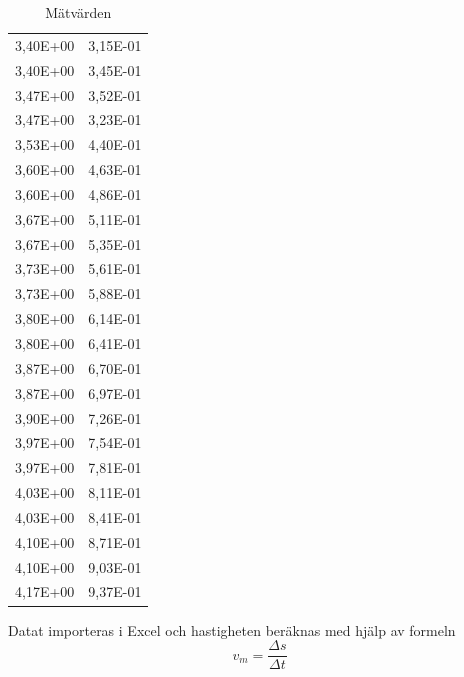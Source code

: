 \documentclass[11p, titlepage, oneside, a4paper]{article}
\begin{document}
\begin{table}
\begin{center}
\begin{tabular}{ |c|c| }
                3,40E+00 & 3,15E-01 \\
                3,40E+00 & 3,45E-01 \\
                3,47E+00 & 3,52E-01 \\
                3,47E+00 & 3,23E-01 \\
                3,53E+00 & 4,40E-01 \\
                3,60E+00 & 4,63E-01 \\
                3,60E+00 & 4,86E-01 \\
                3,67E+00 & 5,11E-01 \\
                3,67E+00 & 5,35E-01 \\
                3,73E+00 & 5,61E-01 \\
                3,73E+00 & 5,88E-01 \\
                3,80E+00 & 6,14E-01 \\
                3,80E+00 & 6,41E-01 \\
                3,87E+00 & 6,70E-01 \\
                3,87E+00 & 6,97E-01 \\
                3,90E+00 & 7,26E-01 \\
                3,97E+00 & 7,54E-01 \\
                3,97E+00 & 7,81E-01 \\
                4,03E+00 & 8,11E-01 \\
                4,03E+00 & 8,41E-01 \\
                4,10E+00 & 8,71E-01 \\
                4,10E+00 & 9,03E-01 \\
                4,17E+00 & 9,37E-01 \\
                \hline
            \end{tabular}
                \caption{Mätvärden}
                \label{table:result}
            \end{center}
        \end{table}            



    Datat importeras i Excel och hastigheten beräknas med hjälp av formeln
    \begin{equation}
        v_m = \frac{\Delta s}{\Delta t}
    \end{equation}
\end{document}
